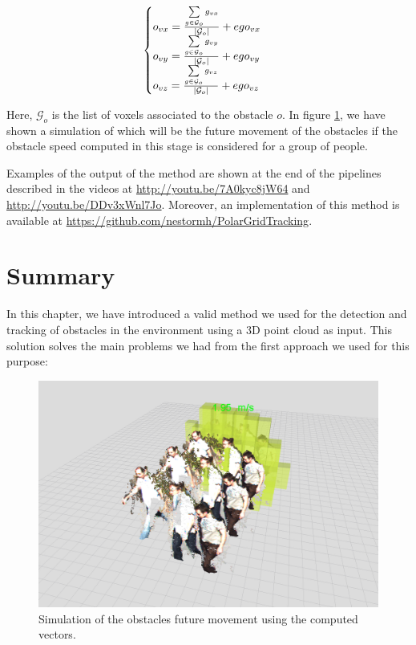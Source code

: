 \begin{equation}\label{eq:cp05_obstacle_vectors_computation}
\begin{cases}
o_{vx} = {{\sum\limits_{g \in \mathcal{G}_o} g_{vx}} \over {|\mathcal{G}_o|}} + ego_{vx}\\
o_{vy} = {{\sum\limits_{g \in \mathcal{G}_o} g_{vy}} \over {|\mathcal{G}_o|}} + ego_{vy}\\
o_{vz} = {{\sum\limits_{g \in \mathcal{G}_o} g_{vz}} \over {|\mathcal{G}_o|}} + ego_{vz}
\end{cases}
\end{equation}

Here, $\mathcal{G}_o$ is the list of voxels associated to the obstacle $o$. In figure \ref{fig:cp05_obstacle_vectors_computation}, we have shown a simulation of which will be the future movement of the obstacles if the obstacle speed computed in this stage is considered for a group of people.

Examples of the output of the method are shown at the end of the pipelines described in the videos at \url{http://youtu.be/7A0kyc8jW64} and \url{http://youtu.be/DDv3xWnl7Jo}. Moreover, an implementation of this method is available at \url{https://github.com/nestormh/PolarGridTracking}.

\section{Summary}\label{ch:chapter05_03}
 
In this chapter, we have introduced a valid method we used for the detection and tracking of obstacles in the environment using a 3D point cloud as input. This solution solves the main problems we had from the first approach we used for this purpose:

\begin{figure}[h!]
  \centering
  \includegraphics{fakePointCloud}
  \caption{Simulation of the obstacles future movement using the computed vectors.}\label{fig:cp05_obstacle_vectors_computation}
\end{figure}

